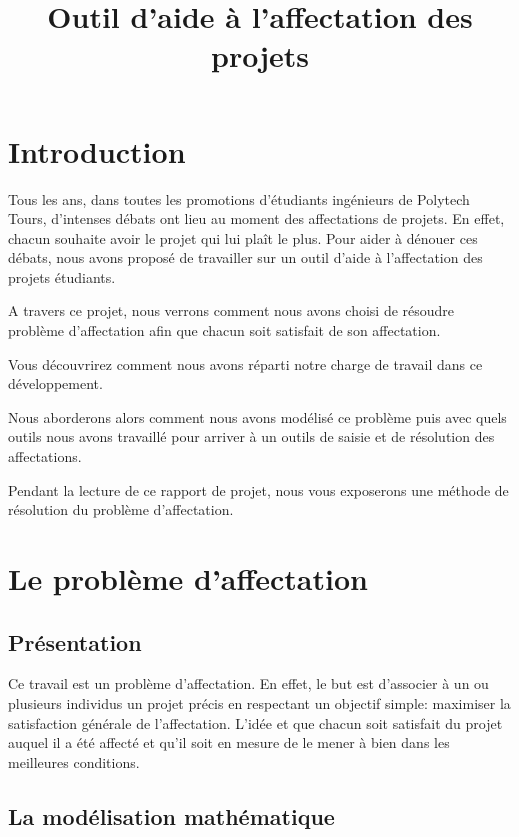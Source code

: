\documentclass[final,poster]{polytech/polytech}
\title{Outil d'aide à l'affectation des projets}
\begin{document}

\chapter*{Introduction\label{chap:intro}}


Tous les ans, dans toutes les promotions d'étudiants ingénieurs de Polytech Tours, d'intenses débats ont lieu au moment des affectations de projets. En effet, chacun souhaite avoir le projet qui lui plaît le plus. Pour aider à dénouer ces débats, nous avons proposé de travailler sur un outil d'aide à l'affectation des projets étudiants. 

A travers ce projet, nous verrons comment nous avons choisi de résoudre problème d'affectation afin que chacun soit satisfait de son affectation.

Vous découvrirez comment nous avons réparti notre charge de travail dans ce développement.

Nous aborderons alors comment nous avons modélisé ce problème puis avec quels outils nous avons travaillé pour arriver à un outils de saisie et de résolution des affectations.

Pendant la lecture de ce rapport de projet, nous vous exposerons une méthode de résolution du problème d'affectation.

\chapter{Le problème d'affectation\label{chap:pb_affectation}}


\section{Présentation\label{sec:pres_affectation}}


Ce travail est un problème d'affectation.
En effet, le but est d'associer à un ou plusieurs individus un projet précis en respectant un objectif simple: maximiser la satisfaction générale de l'affectation.
L'idée et que chacun soit satisfait du projet auquel il a été affecté et qu'il soit en mesure de le mener à bien dans les meilleures conditions.


\section{La modélisation mathématique\label{sec:mod_math}}
\end{document}
